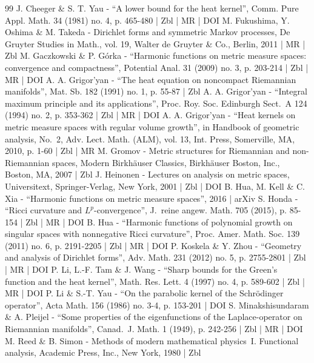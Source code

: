 \begin{thebibliography}{99}
J. Cheeger \& S. T. Yau - “A lower bound for the heat kernel”, Comm. Pure Appl. Math. 34 (1981) no. 4, p. 465-480 | Zbl | MR | DOI
M. Fukushima, Y. Oshima \& M. Takeda - Dirichlet forms and symmetric Markov processes, De Gruyter Studies in Math., vol. 19, Walter de Gruyter \& Co., Berlin, 2011 | MR | Zbl
M. Gaczkowski \& P. Górka - “Harmonic functions on metric measure spaces: convergence and compactness”, Potential Anal. 31 (2009) no. 3, p. 203-214 | Zbl | MR | DOI
A. A. Grigor’yan - “The heat equation on noncompact Riemannian manifolds”, Mat. Sb. 182 (1991) no. 1, p. 55-87 | Zbl
A. A. Grigor’yan - “Integral maximum principle and its applications”, Proc. Roy. Soc. Edinburgh Sect. A 124 (1994) no. 2, p. 353-362 | Zbl | MR | DOI
A. A. Grigor’yan - “Heat kernels on metric measure spaces with regular volume growth”, in Handbook of geometric analysis, No. 2, Adv. Lect. Math. (ALM), vol. 13, Int. Press, Somerville, MA, 2010, p. 1-60 | Zbl | MR
M. Gromov - Metric structures for Riemannian and non-Riemannian spaces, Modern Birkhäuser Classics, Birkhäuser Boston, Inc., Boston, MA, 2007 | Zbl
J. Heinonen - Lectures on analysis on metric spaces, Universitext, Springer-Verlag, New York, 2001 | Zbl | DOI
B. Hua, M. Kell \& C. Xia - “Harmonic functions on metric measure spaces”, 2016 | arXiv
S. Honda - “Ricci curvature and $L^p$-convergence”, J. reine angew. Math. 705 (2015), p. 85-154 | Zbl | MR | DOI
B. Hua - “Harmonic functions of polynomial growth on singular spaces with nonnegative Ricci curvature”, Proc. Amer. Math. Soc. 139 (2011) no. 6, p. 2191-2205 | Zbl | MR | DOI
P. Koskela \& Y. Zhou - “Geometry and analysis of Dirichlet forms”, Adv. Math. 231 (2012) no. 5, p. 2755-2801 | Zbl | MR | DOI
P. Li, L.-F. Tam \& J. Wang - “Sharp bounds for the Green’s function and the heat kernel”, Math. Res. Lett. 4 (1997) no. 4, p. 589-602 | Zbl | MR | DOI
P. Li \& S.-T. Yau - “On the parabolic kernel of the Schrödinger operator”, Acta Math. 156 (1986) no. 3-4, p. 153-201 | DOI
S. Minakshisundaram \& A. Pleijel - “Some properties of the eigenfunctions of the Laplace-operator on Riemannian manifolds”, Canad. J. Math. 1 (1949), p. 242-256 | Zbl | MR | DOI
M. Reed \& B. Simon - Methods of modern mathematical physics I. Functional analysis, Academic Press, Inc., New York, 1980 | Zbl

\end{thebibliography}
